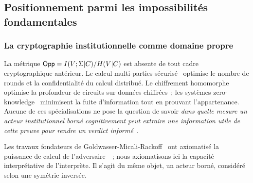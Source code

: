 \subsection{Positionnement parmi les impossibilit\'es fondamentales}
\label{subsec:positionnement_impossibilites}
\begin{sloppypar}

\subsubsection{La cryptographie institutionnelle comme domaine propre}
\label{subsubsec:crypto_institutionnelle_domaine}

La m\'etrique $\mathsf{Opp} = I(V;\Sigma|C)/H(V|C)$ est absente de tout cadre
cryptographique ant\'erieur. Le calcul multi-parties
s\'ecuris\'e~\cite{Yao82,GMW87,Goldreich1987,Evans2018} optimise le
nombre de rounds et la confidentialit\'e du calcul distribu\'e. Le
chiffrement homomorphe~\cite{Gentry09,Vaikuntanathan2012,Brakerski2014}
optimise la profondeur de circuits sur donn\'ees chiffr\'ees~; les
syst\`emes zero-knowledge~\cite{GMR85,Groth16,BCTV14} minimisent la
fuite d'information tout en prouvant l'appartenance. Aucune de ces
sp\'ecialisations ne pose la question de savoir \emph{dans quelle mesure un
acteur institutionnel born\'e cognitivement peut extraire une
information utile de cette preuve pour rendre un verdict
inform\'e}~\cite{Simon82,Miller56,Kahneman11}.

Les travaux fondateurs de Goldwasser-Micali-Rackoff~\cite{GMR85} ont
axiomatis\'e la puissance de calcul de
l'adversaire~\cite{Goldreich01,Bellare97}~; nous axiomatisons ici la
capacit\'e interpr\'etative de l'interpr\`ete. Il s'agit du m\^eme objet, un acteur
born\'e, consid\'er\'e selon une sym\'etrie invers\'ee.


\end{sloppypar}
